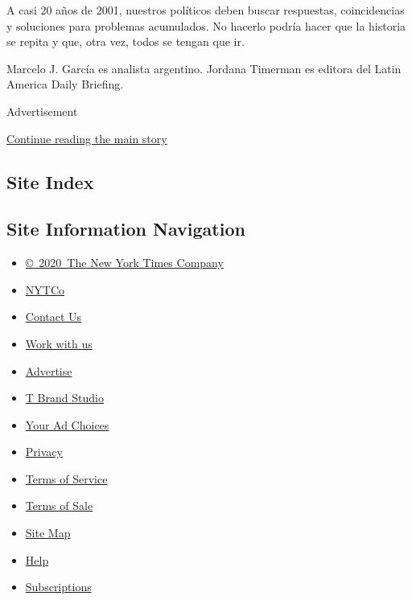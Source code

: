 A casi 20 años de 2001, nuestros políticos deben buscar respuestas,
coincidencias y soluciones para problemas acumulados. No hacerlo podría
hacer que la historia se repita y que, otra vez, todos se tengan que ir.

Marcelo J. García es analista argentino. Jordana Timerman es editora del
Latin America Daily Briefing.

Advertisement

\protect\hyperlink{after-bottom}{Continue reading the main story}

\hypertarget{site-index}{%
\subsection{Site Index}\label{site-index}}

\hypertarget{site-information-navigation}{%
\subsection{Site Information
Navigation}\label{site-information-navigation}}

\begin{itemize}
\tightlist
\item
  \href{https://help.nytimes3xbfgragh.onion/hc/en-us/articles/115014792127-Copyright-notice}{©~2020~The
  New York Times Company}
\end{itemize}

\begin{itemize}
\tightlist
\item
  \href{https://www.nytco.com/}{NYTCo}
\item
  \href{https://help.nytimes3xbfgragh.onion/hc/en-us/articles/115015385887-Contact-Us}{Contact
  Us}
\item
  \href{https://www.nytco.com/careers/}{Work with us}
\item
  \href{https://nytmediakit.com/}{Advertise}
\item
  \href{http://www.tbrandstudio.com/}{T Brand Studio}
\item
  \href{https://www.nytimes3xbfgragh.onion/privacy/cookie-policy\#how-do-i-manage-trackers}{Your
  Ad Choices}
\item
  \href{https://www.nytimes3xbfgragh.onion/privacy}{Privacy}
\item
  \href{https://help.nytimes3xbfgragh.onion/hc/en-us/articles/115014893428-Terms-of-service}{Terms
  of Service}
\item
  \href{https://help.nytimes3xbfgragh.onion/hc/en-us/articles/115014893968-Terms-of-sale}{Terms
  of Sale}
\item
  \href{https://spiderbites.nytimes3xbfgragh.onion}{Site Map}
\item
  \href{https://help.nytimes3xbfgragh.onion/hc/en-us}{Help}
\item
  \href{https://www.nytimes3xbfgragh.onion/subscription?campaignId=37WXW}{Subscriptions}
\end{itemize}
